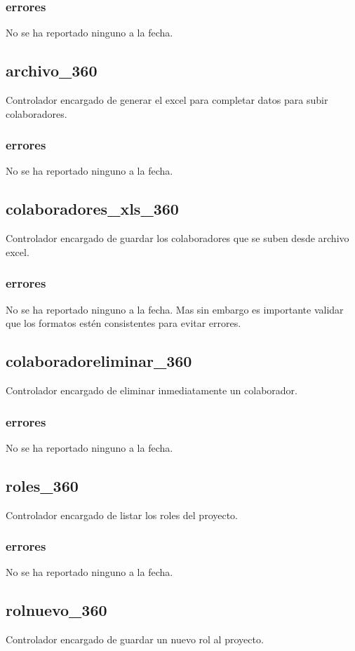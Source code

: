 \documentclass[10pt,a4paper]{book}
\begin{document}
	\subsubsection{errores}
	No se ha reportado ninguno a la fecha.
	
	\subsection{archivo\_360}
	Controlador encargado de generar el excel para completar datos para subir colaboradores.
	\subsubsection{errores}
	No se ha reportado ninguno a la fecha.
	
	\subsection{colaboradores\_xls\_360}
	Controlador encargado de guardar los colaboradores que se suben desde archivo excel.
	\subsubsection{errores}
	No se ha reportado ninguno a la fecha. Mas sin embargo es importante validar que los formatos estén consistentes para evitar errores.
	
	\subsection{colaboradoreliminar\_360}
	Controlador encargado de eliminar inmediatamente un colaborador.
	\subsubsection{errores}
	No se ha reportado ninguno a la fecha.
	
	\subsection{roles\_360}
	Controlador encargado de listar los roles del proyecto.
	\subsubsection{errores}
	No se ha reportado ninguno a la fecha.
	
	\subsection{rolnuevo\_360}
	Controlador encargado de guardar un nuevo rol al proyecto.
\end{document}
